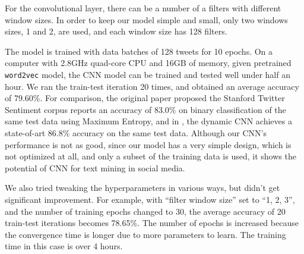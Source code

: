 For the convolutional layer, there can be a number of a filters with different window sizes. In order to keep our model simple and small, only two windows sizes, 1 and 2, are used, and each window size has 128 filters. 

The model is trained with data batches of 128 tweets for 10 epochs. On a computer with 2.8GHz quad-core CPU and 16GB of memory, given pretrained {\tt word2vec} model, the CNN model can be trained and tested well under half an hour. We ran the train-test iteration 20 times, and obtained an average accuracy of 79.60\%. For comparison, the original paper proposed the Stanford Twitter Sentiment corpus \cite{go2009} reports an accuracy of 83.0\% on binary classification of the same test data using Maximum Entropy, and in \cite{kalchbrenner2014}, the dynamic CNN achieves a state-of-art 86.8\% accuracy on the same test data. Although our CNN's performance is not as good, since our model has a very simple design, which is not optimized at all, and only a subset of the training data is used, it shows the potential of CNN for text mining in social media. 

We also tried tweaking the hyperparameters in various ways, but didn't get significant improvement. For example, with ``filter window size'' set to ``1, 2, 3'', and the number of training epochs changed to 30, the average accuracy of 20 train-test iterations becomes 78.65\%. The number of epochs is increased because the convergence time is longer due to more parameters to learn. The training time in this case is over 4 hours. 